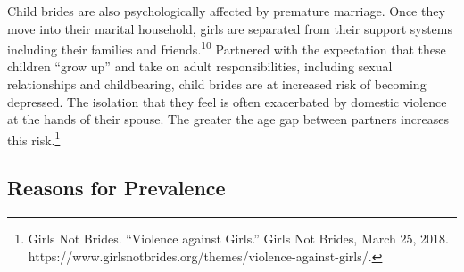 \documentclass[10pt, letterpaper]{article}
\begin{document}
Child brides are also psychologically affected by premature marriage.
Once they move into their marital household, girls are separated from
their support systems including their families and
friends.\textsuperscript{10} Partnered with the expectation that these
children ``grow up'' and take on adult responsibilities, including
sexual relationships and childbearing, child brides are at increased
risk of becoming depressed. The isolation that they feel is often
exacerbated by domestic violence at the hands of their spouse. The
greater the age gap between partners increases this risk.\footnote{Girls
  Not Brides. ``Violence against Girls.'' Girls Not Brides, March 25,
  2018. https://www.girlsnotbrides.org/themes/violence-against-girls/.} \\

\subsection{Reasons for Prevalence}
\end{document}
